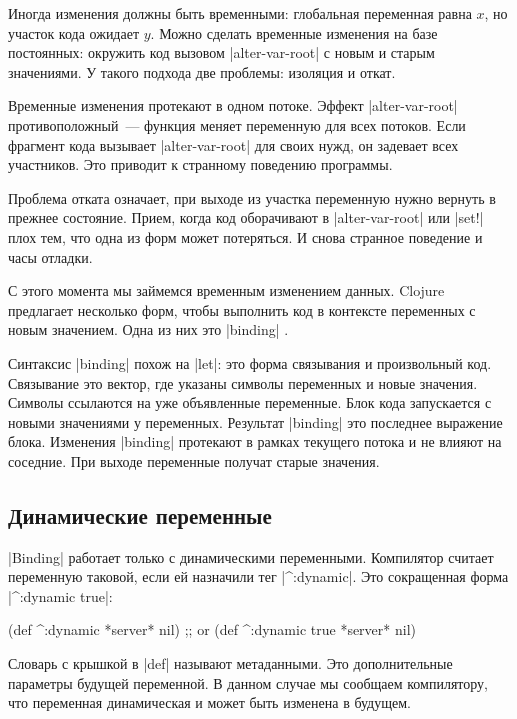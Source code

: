 Иногда изменения должны быть временными: глобальная переменная равна $x$, но
участок кода ожидает $y$. Можно сделать временные изменения на базе постоянных:
окружить код вызовом \spverb|alter-var-root| с новым и старым значениями. У
такого подхода две проблемы: изоляция и откат.

Временные изменения протекают в одном потоке. Эффект \spverb|alter-var-root|
противоположный~--- функция меняет переменную для всех потоков. Если фрагмент
кода вызывает \spverb|alter-var-root| для своих нужд, он задевает всех
участников. Это приводит к странному поведению программы.

Проблема отката означает, при выходе из участка переменную нужно вернуть в
прежнее состояние. Прием, когда код оборачивают в \spverb|alter-var-root| или
\spverb|set!| плох тем, что одна из форм может потеряться. И снова странное
поведение и часы отладки.

С этого момента мы займемся временным изменением данных. Clojure предлагает
несколько форм, чтобы выполнить код в контексте переменных с новым
значением. Одна из них это \spverb|binding| .

Синтаксис \spverb|binding| похож на \spverb|let|: это форма связывания и
произвольный код. Связывание это вектор, где указаны символы переменных и новые
значения. Символы ссылаются на уже объявленные переменные. Блок кода запускается
с новыми значениями у переменных. Результат \spverb|binding| это последнее
выражение блока. Изменения \spverb|binding| протекают в рамках текущего потока и
не влияют на соседние. При выходе переменные получат старые значения.

\subsection{Динамические переменные}

\label{dynamic-vars}

\spverb|Binding| работает только с динамическими переменными. Компилятор считает
переменную таковой, если ей назначили тег \spverb|^:dynamic|. Это сокращенная
форма \spverb|^{:dynamic true}|:

\begin{english}
  \begin{clojure}
(def ^:dynamic *server* nil)
;; or
(def ^{:dynamic true} *server* nil)
  \end{clojure}
\end{english}

Словарь с крышкой в \spverb|def| называют метаданными. Это дополнительные
параметры будущей переменной. В данном случае мы сообщаем компилятору, что
переменная динамическая и может быть изменена в будущем.

